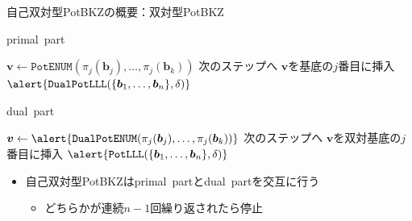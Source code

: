 \documentclass[12pt,aspectratio=169,xcolor=dvipsnames,table,dvipdfmx, leqno]{beamer}
\begin{document}
\begin{frame}[fragile]{自己双対型PotBKZの概要：双対型PotBKZ}
\begin{minipage}[b]{0.45\columnwidth}
    \begin{algorithm}[H]
    \footnotesize
        \begin{algorithmic}[1]
            \caption{\footnotesize primal~part}
            \State $\bm{v}\gets \texttt{PotENUM}(\pi_j(\bm{b}_j), \dots, \pi_j(\bm{b}_k))$
                \State 次のステップへ
            \Else
                \State $\bm{v}$を基底の$j$番目に挿入
                \State $\alert{\texttt{DualPotLLL}(\{\bm{b}_1,\ldots,\bm{b}_n\}, \delta)}$
            \EndIf
        \end{algorithmic}
    \end{algorithm}
\end{minipage}
\begin{minipage}[b]{0.45\columnwidth}
\begin{algorithm}[H]
\footnotesize
    \begin{algorithmic}[1]
        \caption{\footnotesize dual~part}
        \State $\bm{v}\gets \alert{\texttt{DualPotENUM}(\pi_j(\bm{b}_j), \dots, \pi_j(\bm{b}_k))}$
            \State 次のステップへ
        \Else
            \State $\bm{v}$を双対基底の$j$番目に挿入\cite{MW16}
            \State $\alert{\texttt{PotLLL}(\{\bm{b}_1,\ldots,\bm{b}_n\}, \delta)}$
        \EndIf
    \end{algorithmic}
\end{algorithm}
\end{minipage}
\begin{itemize}
    \item 自己双対型PotBKZはprimal~partとdual~partを交互に行う
    \begin{itemize}
        \item どちらかが連続$n-1$回繰り返されたら停止
    \end{itemize}
\end{itemize}
\end{frame}
\fi
\end{document}
